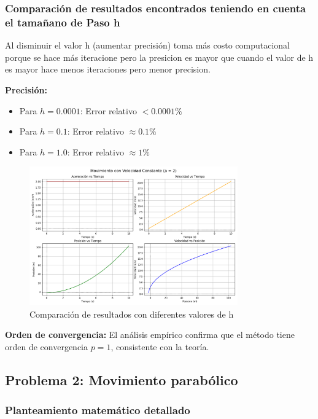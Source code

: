 \documentclass{article}
\begin{document}
\begin{center}
	\subsubsection{Comparación de resultados encontrados teniendo en cuenta el tamañano de Paso h} 
	
	
	Al disminuir el valor h (aumentar precisión) toma más costo computacional porque se hace más iteracione pero la presicion es mayor que cuando el valor de h es mayor hace menos iteraciones pero menor precision.
	
	\textbf{Precisión:}
	\begin{itemize}
	\item Para $h = 0.0001$: Error relativo $< 0.0001\%$
	\item Para $h = 0.1$: Error relativo $\approx 0.1\%$
	\item Para $h = 1.0$: Error relativo $\approx 1\%$
	\end{itemize}

    \begin{figure}[H]
    \centering
    \includegraphics[width=0.8\textwidth]{img/1-3.png}
    \caption{Comparación de resultados con diferentes valores de h}
    \label{fig:salida_consola}
\end{figure}
	
	\textbf{Orden de convergencia:}
	El análisis empírico confirma que el método tiene orden de convergencia $p = 1$, consistente con la teoría.


	\subsection{Problema 2: Movimiento parabólico}
	
	\subsubsection{Planteamiento matemático detallado}
	

\end{center}
\end{document}
